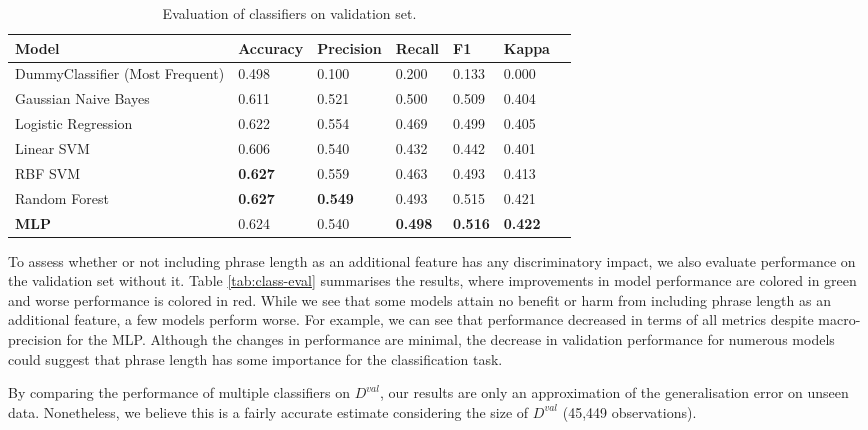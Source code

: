 \documentclass{article}
\begin{document}
\begin{table*}[h]
\caption{Evaluation of classifiers on validation set.} 
\label{tab:feat-class-eval}
\centering 
\setlength\aboverulesep{0pt}
\setlength\belowrulesep{0pt}
\setlength\doublerulesep{0pt}
\setlength\extrarowheight{3pt}
\small
\begin{tabularx}{0.9\textwidth}{l p{1.5cm} XXXXX}
    \toprule
    Model & Accuracy & Precision & Recall & F1 & Kappa \\
    \midrule 
    DummyClassifier (Most Frequent) & 0.498 & 0.100 & 0.200 & 0.133 & 0.000 \\ 
    Gaussian Naive Bayes & 0.611 & 0.521 & 0.500 & 0.509 & 0.404 \\ 
    Logistic Regression & 0.622 & 0.554 & 0.469 & 0.499 & 0.405 \\ 
    Linear SVM & 0.606 & 0.540 & 0.432 & 0.442 & 0.401 \\ 
    RBF SVM & \textbf{0.627} & 0.559 & 0.463 & 0.493 & 0.413 \\ 
    Random Forest & \textbf{0.627} & \textbf{0.549} & 0.493 & 0.515 & 0.421 \\ 
    \textbf{MLP} & 0.624 & 0.540 & \textbf{0.498} & \textbf{0.516} & \textbf{0.422} \\ 
    \bottomrule
\end{tabularx}
\end{table*}

To assess whether or not including phrase length as an additional feature has any discriminatory impact, we also evaluate performance on the validation set without it. Table \ref{tab:class-eval} summarises the results, where improvements in model performance are colored in green and worse performance is colored in red. While we see that some models attain no benefit or harm from including phrase length as an additional feature, a few models perform worse. For example, we can see that performance decreased in terms of all metrics despite macro-precision for the MLP. Although the changes in performance are minimal, the decrease in validation performance for numerous models could suggest that phrase length has some importance for the classification task.

By comparing the performance of multiple classifiers on $D^{val}$, our results are only an approximation of the generalisation error on unseen data. Nonetheless, we believe this is a fairly accurate estimate considering the size of $D^{val}$ (45,449 observations).
\end{document}
